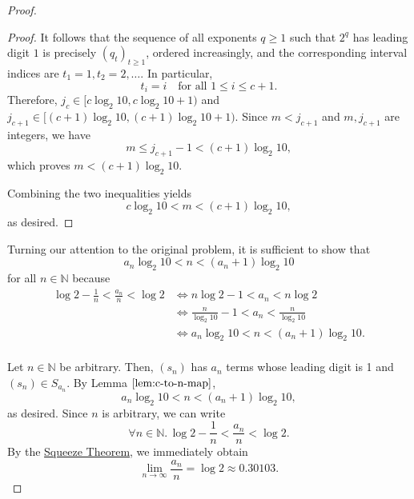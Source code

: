 \documentclass{article}
\newenvironment{lemmaproof}
  {\renewcommand{\qedsymbol}{$\blacksquare$}\begin{proof}}
  {\end{proof}}
\begin{document}
\begin{proof}
\begin{lemmaproof}
  It follows that the sequence of all exponents $q \ge 1$ such that $2^q$ has leading digit $1$ is precisely $(q_t)_{t \ge 1}$, ordered increasingly, and the corresponding interval indices are $t_1 = 1, t_2 = 2, \dots$.
  In particular,
  \[
    t_i = i \quad \text{for all } 1 \le i \le c+1.
  \]
  Therefore, $j_c \in [c \log_2 10, c \log_2 10 + 1)$ and $j_{c+1} \in [(c+1)\log_2 10, (c+1)\log_2 10 + 1)$. Since $m < j_{c+1}$ and $m, j_{c+1}$ are integers, we have
  \[
    m \le j_{c+1} - 1 < (c+1)\log_2 10,
  \]
  which proves $m < (c+1) \log_2 10$.

  Combining the two inequalities yields
  \[
    c \log_2 10 < m < (c+1) \log_2 10,
  \]
  as desired.
\end{lemmaproof}

    Turning our attention to the original problem, it is sufficient to show that 
    \[
    a_{n} \log_{2}{10} < n < (a_{n} + 1) \log_{2}{10}
    \]
    for all $n \in \mathbb{N}$ because
    \begin{align*}
      \log{2} - \frac{1}{n} < \frac{a_{n}}{n} < \log{2} &\iff n \log{2} - 1  < a_{n} < n \log{2} \\
                                                        &\iff \frac{n}{\log_{2}{10}} - 1 < a_{n} < \frac{n}{\log_{2}{10}} \\
                                                        &\iff a_{n} \log_{2}{10} < n < (a_{n} + 1) \log_{2}{10}. \\
    \end{align*}


    Let $n \in \mathbb{N}$ be arbitrary. Then, $(s_{n})$ has $a_{n}$ terms whose leading digit is 1 and $(s_{n}) \in S_{a_{n}}$.
    By Lemma $\ref{lem:c-to-n-map}$,
    \[
      a_{n} \log_{2}{10} < n < (a_{n} + 1)\log_{2}{10},
    \]
    as desired. Since $n$ is arbitrary, we can write 
    \[
      \forall n \in \mathbb{N}.\, \log{2} - \frac{1}{n} < \frac{a_{n}}{n} < \log{2}.
    \]
    By the \href{https://brilliant.org/wiki/squeeze-theorem/#statement-of-the-theorem-and-its-intuition}{Squeeze Theorem}, we immediately obtain
    \[
      \lim_{n \to \infty} \frac{a_{n}}{n} = \log{2} \approx 0.30103. 
    \]

  \end{proof}
\end{document}
